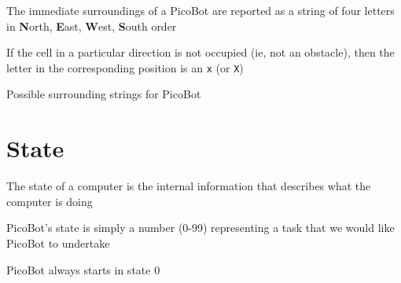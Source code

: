 \documentclass[8pt,a4paper,compress]{beamer}
\begin{document}
\begin{frame}[fragile]
The immediate surroundings of a PicoBot are reported as a string of four letters in \textbf{N}orth, \textbf{E}ast, \textbf{W}est, \textbf{S}outh order

\pause
\bigskip

If the cell in a particular direction is not occupied (ie, not an obstacle), then the letter in the corresponding position is an \lstinline{x} (or \lstinline{X})

\pause
\bigskip

Possible surrounding strings for PicoBot
\begin{center}
\end{center}
\end{frame}

\section{State}
\begin{frame}[fragile]
\pause

The state of a computer is the internal information that describes what the computer is doing

\pause
\bigskip

PicoBot's state is simply a number (0-99) representing a task that we would like PicoBot to undertake

\bigskip

\pause
PicoBot always starts in state 0
\end{frame}
\end{document}
